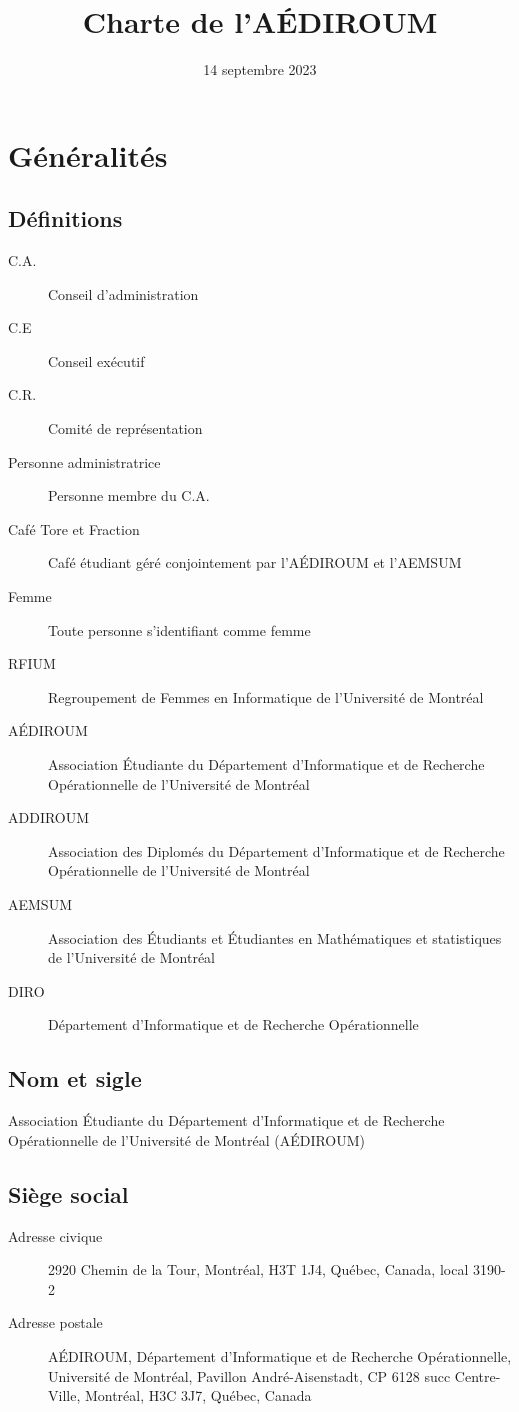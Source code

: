 \documentclass{aediroum}
\title{Charte de l'AÉDIROUM}
\date{14 septembre 2023}
\begin{document}
\maketitle

\section{Généralités}\label{sec:generalites}

\subsection{Définitions}\label{sec:definitions}
\begin{description}
    \item[C.A.] Conseil d’administration
    \item[C.E] Conseil exécutif
    \item[C.R.] Comité de représentation
    \item[Personne administratrice] Personne membre du C.A.
    \item[Café Tore et Fraction] Café étudiant géré conjointement par l’AÉDIROUM et l’AEMSUM
    \item[Femme] Toute personne s'identifiant comme femme
    \item[RFIUM] Regroupement de Femmes en Informatique de l'Université de Montréal
    \item[AÉDIROUM] Association Étudiante du Département d'Informatique et de Recherche Opérationnelle de l'Université de Montréal
    \item[ADDIROUM] Association des Diplomés du Département d'Informatique et de Recherche Opérationnelle de l'Université de Montréal
    \item[AEMSUM] Association des Étudiants et Étudiantes en Mathématiques et statistiques de l'Université de Montréal
    \item[DIRO] Département d'Informatique et de Recherche Opérationnelle
\end{description}


\subsection{Nom et sigle}\label{sec:nom-et-sigle}
Association Étudiante du Département d'Informatique et de Recherche Opérationnelle de l'Université de Montréal (AÉDIROUM)

\subsection{Siège social}\label{sec:siege-social}
  \begin{description}
  \item[Adresse civique] 2920 Chemin de la Tour, Montréal, H3T 1J4, Québec, Canada, local 3190-2
  \item[Adresse postale] AÉDIROUM, Département d'Informatique et de Recherche Opérationnelle, Université de Montréal, Pavillon André-Aisenstadt, CP 6128 succ Centre-Ville, Montréal, H3C 3J7, Québec, Canada
  \end{description}
\end{document}
